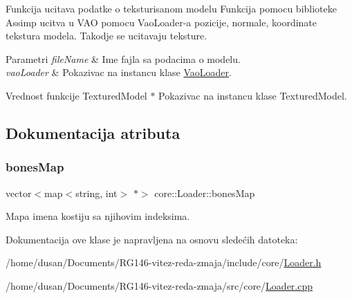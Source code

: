 Funkcija ucitava podatke o teksturisanom modelu Funkcija pomocu biblioteke Assimp ucitva u V\+AO pomocu Vao\+Loader-\/a pozicije, normale, koordinate tekstura modela. Takodje se ucitavaju teksture. 


\begin{DoxyParams}{Parametri}
{\em file\+Name} & Ime fajla sa podacima o modelu. \\
\hline
{\em vao\+Loader} & Pokazivac na instancu klase \hyperlink{classcore_1_1VaoLoader}{Vao\+Loader}. \\
\hline
\end{DoxyParams}
\begin{DoxyReturn}{Vrednost funkcije}
Textured\+Model $\ast$ Pokazivac na instancu klase Textured\+Model. 
\end{DoxyReturn}


\subsection{Dokumentacija atributa}
\mbox{\label{classcore_1_1Loader_a86ae8bc5968de3aa3c7450acadfb6fea}} 
\subsubsection{\texorpdfstring{bones\+Map}{bonesMap}}
{\footnotesize\ttfamily vector$<$map$<$string, int$>$ $\ast$$>$ core\+::\+Loader\+::bones\+Map\hspace{0.3cm}{\ttfamily [private]}}



Mapa imena kostiju sa njihovim indeksima. 



Dokumentacija ove klase je napravljena na osnovu sledećih datoteka\+:\begin{DoxyCompactItemize}
\item 
/home/dusan/\+Documents/\+R\+G146-\/vitez-\/reda-\/zmaja/include/core/\hyperlink{Loader_8h}{Loader.\+h}\item 
/home/dusan/\+Documents/\+R\+G146-\/vitez-\/reda-\/zmaja/src/core/\hyperlink{Loader_8cpp}{Loader.\+cpp}\end{DoxyCompactItemize}
